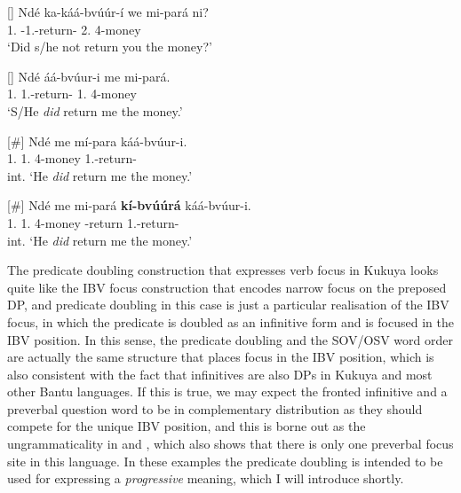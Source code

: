 \documentclass[output=paper,colorlinks,citecolor=brown,
]{langscibook}
\begin{document}
\begin{exe}
     \ex \label{59}
    \begin{xlist}
\ex
[]{
\label{59a}
\gll
Ndé ka-káá-bvúúr-í we mi-pará ni?\\
1.\Pro{} \Neg{}-1\Sm{}.\Pst{}-return-\Pst{} 2\Sg{}.\Pro{} 4-money \Neg{}\\
\trans ‘Did s/he not return you the money?’
}

\ex
[]{
\label{59b}
\gll
Ndé áá-bvúur-i me mi-pará.\\
1.\Pro{} 1\Sm{}.\Pst{}-return-\Pst{} 1\Sg{}.\Pro{} 4-money\\
\trans ‘S/He \textit{did} return me the money.’
}

\ex
[\#]{
\label{59c}
\gll
Ndé me mí-para káá-bvúur-i.\\
1.\Pro{} 1\Sg{}.\Pro{} 4-money 1\Sm{}.\Pst{}-return-\Pst{}\\
\trans int. ‘He \textit{did} return me the money.’
}

\ex
[\#]{
\label{59d}
\gll
Ndé me mi-pará \textbf{kí-bvúúrá} káá-bvúur-i.\\
1.\Pro{} 1\Sg{}.\Pro{} 4-money \Inf{}-return 1\Sm{}.\Pst{}-return-\Pst{}\\
\trans int. ‘He \textit{did} return me the money.’
}

    \end{xlist}
\end{exe}
The predicate doubling construction that expresses verb focus in Kukuya looks quite like the IBV focus construction that encodes narrow focus on the preposed DP, and predicate doubling in this case is just a particular realisation of the IBV focus, in which the predicate is doubled as an infinitive form and is focused in the IBV position. In this sense, the predicate doubling and the SOV/OSV word order are actually the same structure that places focus in the IBV position, which is also consistent with the fact that infinitives are also DPs in Kukuya and most other Bantu languages. If this is true, we may expect the fronted infinitive and a preverbal question word to be in complementary distribution as they should compete for the unique IBV position, and this is borne out as the ungrammaticality in  and , which also shows that there is only one preverbal focus site in this language. In these examples the predicate doubling is intended to be used for expressing a \textit{progressive} meaning, which I will introduce shortly.
\end{document}
